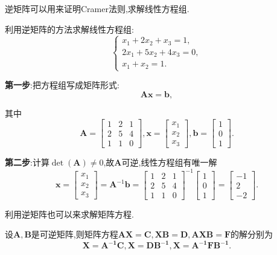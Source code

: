 逆矩阵可以用来证明Cramer法则,求解线性方程组.


\begin{example}
	利用逆矩阵的方法求解线性方程组:
	\[
		\left\{\begin{matrix}
			x_1+2x_2+x_3=1,   \\
			2x_1+5x_2+4x_3=0, \\
			x_1+x_2=1.
		\end{matrix}\right.
	\]
\end{example}
\begin{solution}
	\textbf{第一步}:把方程组写成矩阵形式:
	\[
		\mathbf{A}\mathbf{x}=\mathbf{b},
	\]

	其中
	\[
		\mathbf{A} = \begin{bmatrix}
			1 & 2 & 1 \\
			2 & 5 & 4 \\
			1 & 1 & 0
		\end{bmatrix},
		\mathbf{x}=\begin{bmatrix}
			x_{1} \\
			x_{2} \\
			x_{3}
		\end{bmatrix},
		\mathbf{b}=\begin{bmatrix}
			1 \\
			0 \\
			1
		\end{bmatrix}.
	\]

	\textbf{第二步}:计算$\det(\mathbf{A})\ne0$,故$\mathbf{A}$可逆,线性方程组有唯一解
	\[
		\mathbf{x}=\begin{bmatrix}
			x_{1} \\
			x_{2} \\
			x_{3}
		\end{bmatrix}=\mathbf{A}^{-1}\mathbf{b}=\begin{bmatrix}
			1 & 2 & 1 \\
			2 & 5 & 4 \\
			1 & 1 & 0
		\end{bmatrix}^{-1}\begin{bmatrix}
			1 \\
			0 \\
			1
		\end{bmatrix}=\begin{bmatrix}
			-1 \\
			2  \\
			-2
		\end{bmatrix}.
	\]
\end{solution}

利用逆矩阵也可以来求解矩阵方程.
\begin{example}
	设$\mathbf{A},\mathbf{B}$是可逆矩阵,则矩阵方程$\mathbf{AX=C,XB=D,AXB=F}$的解分别为
	\[
		\mathbf{X=A^{-1}C,X=DB^{-1},X=A^{-1}FB^{-1}}.
	\]
\end{example}

